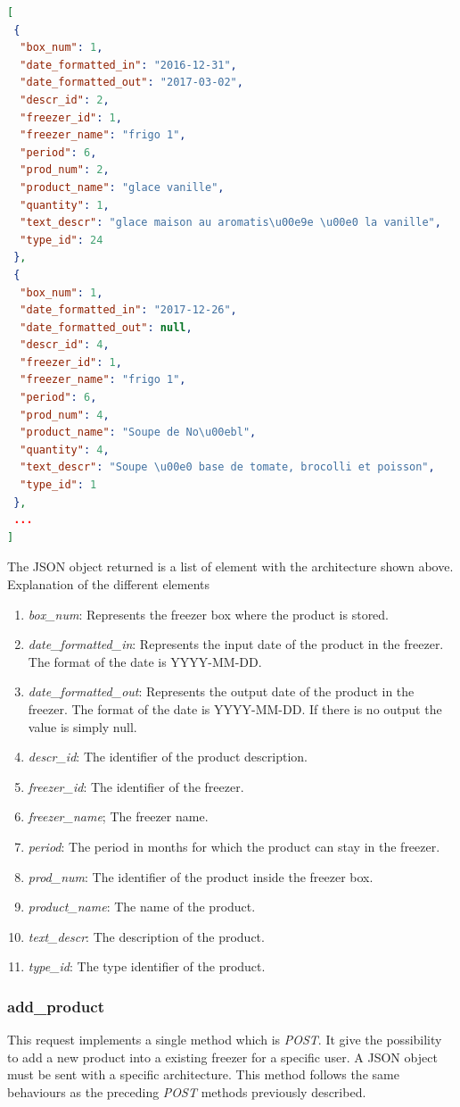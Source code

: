 \begin{lstlisting}[language=json]
[
 {
  "box_num": 1, 
  "date_formatted_in": "2016-12-31", 
  "date_formatted_out": "2017-03-02", 
  "descr_id": 2, 
  "freezer_id": 1, 
  "freezer_name": "frigo 1", 
  "period": 6, 
  "prod_num": 2, 
  "product_name": "glace vanille", 
  "quantity": 1, 
  "text_descr": "glace maison au aromatis\u00e9e \u00e0 la vanille", 
  "type_id": 24
 },
 {
  "box_num": 1, 
  "date_formatted_in": "2017-12-26", 
  "date_formatted_out": null, 
  "descr_id": 4, 
  "freezer_id": 1, 
  "freezer_name": "frigo 1", 
  "period": 6, 
  "prod_num": 4, 
  "product_name": "Soupe de No\u00ebl", 
  "quantity": 4, 
  "text_descr": "Soupe \u00e0 base de tomate, brocolli et poisson", 
  "type_id": 1
 },
 ...
] 
\end{lstlisting}
The JSON object returned is a list of element with the architecture shown above.
Explanation of the different elements
\begin{enumerate}
\item \textit{box\_num}: Represents the freezer box where the product is stored.
\item \textit{date\_formatted\_in}: Represents the input date of the product in the freezer. The format of the date is YYYY-MM-DD.
\item \textit{date\_formatted\_out}: Represents the output date of the product in the freezer. The format of the date is YYYY-MM-DD. If there is no output the value is simply null.
\item \textit{descr\_id}: The identifier of the product description.
\item \textit{freezer\_id}: The identifier of the freezer.
\item \textit{freezer\_name}; The freezer name.
\item \textit{period}: The period in months for which the product can stay in the freezer.
\item \textit{prod\_num}: The identifier of the product inside the freezer box.
\item \textit{product\_name}: The name of the product.
\item \textit{text\_descr}: The description of the product.
\item \textit{type\_id}: The type identifier of the product.
\end{enumerate}

\subsubsection{add\_product}
This request implements a single method which is \textit{POST}. It give the possibility to add a new product into a existing freezer for a specific user. A JSON object must be sent with a specific architecture. This method follows the same behaviours as the preceding \textit{POST} methods previously described.\\

